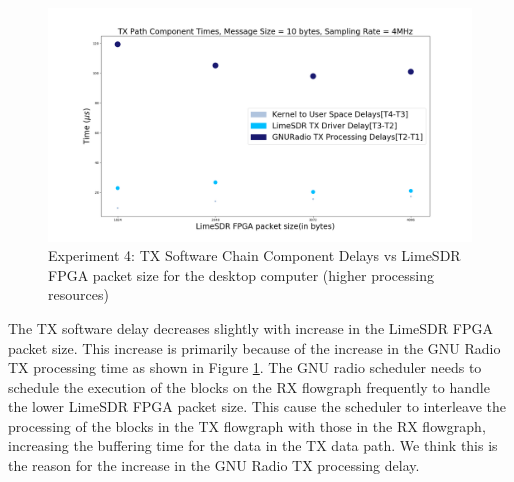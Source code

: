 \begin{figure}[h!]
\centering
\includegraphics[width=\textwidth]{Thesis/Figure/E4M2-4.png}
\caption{Experiment 4: TX Software Chain Component Delays vs LimeSDR FPGA packet size for the desktop computer (higher processing resources)}
\label{e4_m2_4}
\end{figure}

The TX software delay decreases slightly with increase in the LimeSDR FPGA packet size.
This increase is primarily because of the increase in the GNU Radio TX processing time as shown in Figure \ref{e4_m2_4}.
The GNU radio scheduler needs to schedule the execution of the blocks on the RX flowgraph frequently to handle the lower LimeSDR FPGA packet size.
This cause the scheduler to interleave the processing of the blocks in the TX flowgraph with those in the RX flowgraph, increasing the buffering time for the data in the TX data path.
We think this is the reason for the increase in the GNU Radio TX processing delay.\\



